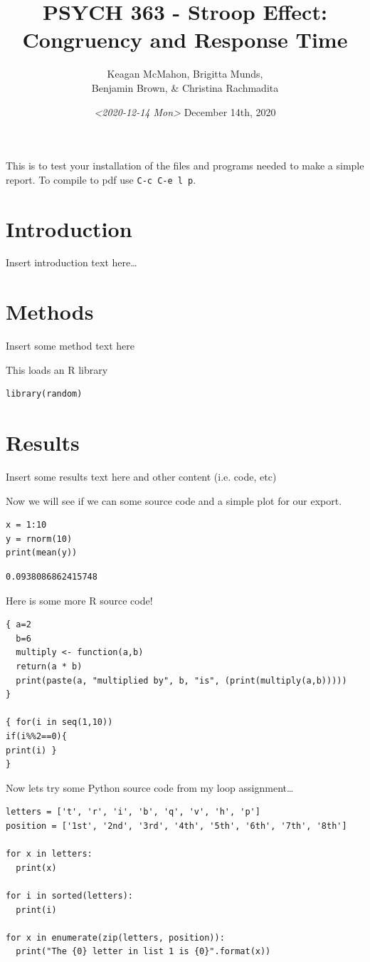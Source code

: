 \documentclass{article}
\author{Keagan McMahon, Brigitta Munds, \\ Benjamin Brown, \& Christina Rachmadita}
\date{\textit{<2020-12-14 Mon>} December 14th, 2020}
\title{PSYCH 363 - Stroop Effect: Congruency and Response Time}
\begin{document}
\maketitle
\tableofcontents

This is to test your installation of the files and programs needed to make a simple report. To compile to pdf use \texttt{C-c C-e l p}.

\section{Introduction}
\label{sec:org204155e}

Insert introduction text here\ldots{}


\section{Methods}
\label{sec:org10a27a8}

Insert some method text here

This loads an R library
\begin{verbatim}
library(random)
\end{verbatim}


\section{Results}
\label{sec:org17b9d7d}

Insert some results text here and other content (i.e. code, etc)

Now we will see if we can some source code and a simple plot for our export.

\begin{verbatim}
x = 1:10
y = rnorm(10)
print(mean(y))
\end{verbatim}

\begin{verbatim}
0.0938086862415748
\end{verbatim}

Here is some more R source code!
\begin{verbatim}
{ a=2
  b=6
  multiply <- function(a,b)
  return(a * b)
  print(paste(a, "multiplied by", b, "is", (print(multiply(a,b)))))
}

{ for(i in seq(1,10))
if(i%%2==0){ 
print(i) }
}
\end{verbatim}

Now lets try some Python source code from my loop assignment\ldots{}

\begin{verbatim}
letters = ['t', 'r', 'i', 'b', 'q', 'v', 'h', 'p']
position = ['1st', '2nd', '3rd', '4th', '5th', '6th', '7th', '8th']

for x in letters:
  print(x)

for i in sorted(letters):
  print(i)

for x in enumerate(zip(letters, position)):
  print("The {0} letter in list 1 is {0}".format(x))

\end{verbatim}
\end{document}
